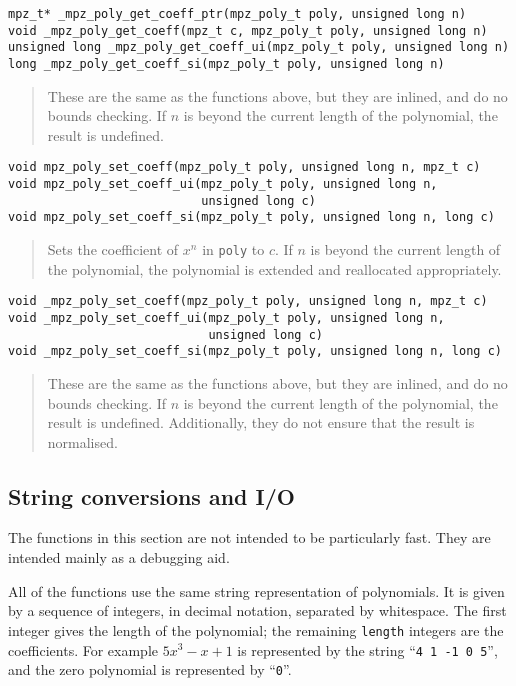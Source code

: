 \documentclass[a4paper,10pt]{article}
\newcommand{\code}{\lstinline}
\begin{document}
\begin{lstlisting}
mpz_t* _mpz_poly_get_coeff_ptr(mpz_poly_t poly, unsigned long n)
void _mpz_poly_get_coeff(mpz_t c, mpz_poly_t poly, unsigned long n)
unsigned long _mpz_poly_get_coeff_ui(mpz_poly_t poly, unsigned long n)
long _mpz_poly_get_coeff_si(mpz_poly_t poly, unsigned long n)
\end{lstlisting}
\begin{quote}
These are the same as the functions above, but they are inlined, and do no bounds checking. If $n$ is beyond the current length of the polynomial, the result is undefined.
\end{quote}


\begin{lstlisting}
void mpz_poly_set_coeff(mpz_poly_t poly, unsigned long n, mpz_t c)
void mpz_poly_set_coeff_ui(mpz_poly_t poly, unsigned long n,
                           unsigned long c)
void mpz_poly_set_coeff_si(mpz_poly_t poly, unsigned long n, long c)
\end{lstlisting}
\begin{quote}
Sets the coefficient of $x^n$ in \code{poly} to $c$. If $n$ is beyond the current length of the polynomial, the polynomial is extended and reallocated appropriately.
\end{quote}


\begin{lstlisting}
void _mpz_poly_set_coeff(mpz_poly_t poly, unsigned long n, mpz_t c)
void _mpz_poly_set_coeff_ui(mpz_poly_t poly, unsigned long n,
                            unsigned long c)
void _mpz_poly_set_coeff_si(mpz_poly_t poly, unsigned long n, long c)
\end{lstlisting}
\begin{quote}
These are the same as the functions above, but they are inlined, and do no bounds checking. If $n$ is beyond the current length of the polynomial, the result is undefined. Additionally, they do not ensure that the result is normalised.
\end{quote}


\subsection{String conversions and I/O}

The functions in this section are not intended to be particularly fast. They are intended mainly as a debugging aid.

All of the functions use the same string representation of polynomials. It is given by a sequence of integers, in decimal notation, separated by whitespace. The first integer gives the length of the polynomial; the remaining \code{length} integers are the coefficients. For example $5x^3 - x + 1$ is represented by the string ``\code{4 1 -1 0 5}'', and the zero polynomial is represented by ``\code{0}''.
\end{document}
